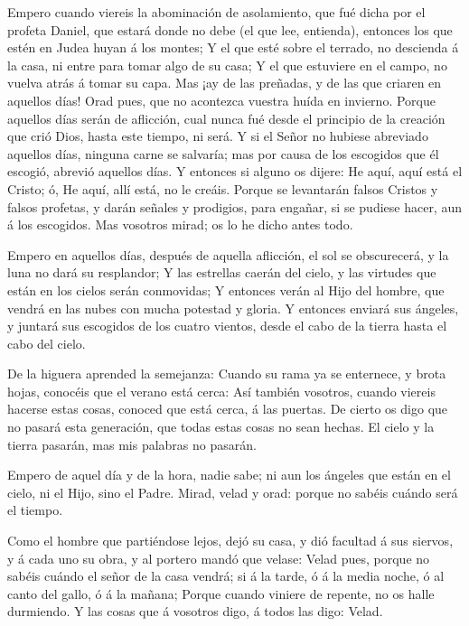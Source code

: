  Empero cuando viereis la abominación de asolamiento, que
fué dicha por el profeta Daniel, que estará donde no debe (el que lee,
entienda), entonces los que estén en Judea huyan á los montes;
 Y el que esté sobre el terrado, no descienda á la casa, ni
entre para tomar algo de su casa;  Y el que estuviere en el
campo, no vuelva atrás á tomar su capa.  Mas ¡ay de las
preñadas, y de las que criaren en aquellos días!  Orad
pues, que no acontezca vuestra huída en invierno.  Porque
aquellos días serán de aflicción, cual nunca fué desde el principio de
la creación que crió Dios, hasta este tiempo, ni será.  Y
si el Señor no hubiese abreviado aquellos días, ninguna carne se
salvaría; mas por causa de los escogidos que él escogió, abrevió
aquellos días.  Y entonces si alguno os dijere: He aquí,
aquí está el Cristo; ó, He aquí, allí está, no le creáis. 
Porque se levantarán falsos Cristos y falsos profetas, y darán señales y
prodigios, para engañar, si se pudiese hacer, aun á los escogidos.
 Mas vosotros mirad; os lo he dicho antes todo.

 Empero en aquellos días, después de aquella aflicción, el
sol se obscurecerá, y la luna no dará su resplandor;  Y las
estrellas caerán del cielo, y las virtudes que están en los cielos serán
conmovidas;  Y entonces verán al Hijo del hombre, que
vendrá en las nubes con mucha potestad y gloria.  Y
entonces enviará sus ángeles, y juntará sus escogidos de los cuatro
vientos, desde el cabo de la tierra hasta el cabo del cielo.

 De la higuera aprended la semejanza: Cuando su rama ya se
enternece, y brota hojas, conocéis que el verano está cerca:
 Así también vosotros, cuando viereis hacerse estas cosas,
conoced que está cerca, á las puertas.  De cierto os digo
que no pasará esta generación, que todas estas cosas no sean hechas.
 El cielo y la tierra pasarán, mas mis palabras no pasarán.

 Empero de aquel día y de la hora, nadie sabe; ni aun los
ángeles que están en el cielo, ni el Hijo, sino el Padre. 
Mirad, velad y orad: porque no sabéis cuándo será el tiempo.

 Como el hombre que partiéndose lejos, dejó su casa, y dió
facultad á sus siervos, y á cada uno su obra, y al portero mandó que
velase:  Velad pues, porque no sabéis cuándo el señor de la
casa vendrá; si á la tarde, ó á la media noche, ó al canto del gallo, ó
á la mañana;  Porque cuando viniere de repente, no os halle
durmiendo.  Y las cosas que á vosotros digo, á todos las
digo: Velad.

